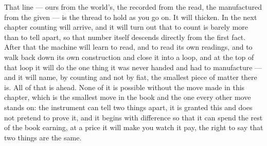 That line --- ours from the world's, the recorded from the read, the manufactured from the given --- is the
thread to hold as you go on. It will thicken. In the next chapter counting will arrive, and it will turn out
that to count is barely more than to tell apart, so that number itself descends directly from the first fact.
After that the machine will learn to read, and to read its own readings, and to walk back down its own
construction and close it into a loop, and at the top of that loop it will do the one thing it was never handed
and had to manufacture --- and it will name, by counting and not by fiat, the smallest piece of matter there is.
All of that is ahead. None of it is possible without the move made in this chapter, which is the smallest move in
the book and the one every other move stands on: the instrument can tell two things apart, it is granted this and
does not pretend to prove it, and it begins with difference so that it can spend the rest of the book earning, at
a price it will make you watch it pay, the right to say that two things are the same.
